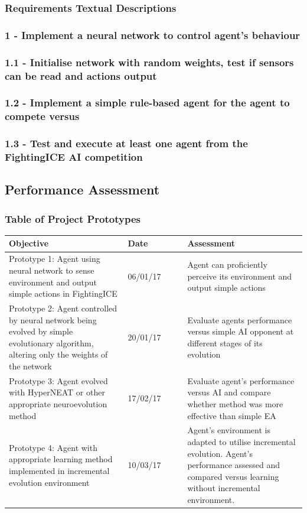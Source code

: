 \documentclass[11pt,a4paper]{article}
\begin{document}
\subsubsection{Requirements Textual Descriptions}
\subsubsection*{1 - Implement a neural network to control agent's behaviour}
\subsubsection*{1.1 - Initialise network with random weights, test if sensors can be read and actions output}
\subsubsection*{1.2 - Implement a simple rule-based agent for the agent to compete versus}
\subsubsection*{1.3 - Test and execute at least one agent from the FightingICE AI competition}
\newpage
\subsection{Performance Assessment}
\subsubsection{Table of Project Prototypes}
\begin{tabular}{|p{0.4\linewidth}|p{0.2\linewidth}|p{0.4\linewidth}|}
\hline
Objective & Date & Assessment\\ \hline
Prototype 1: Agent using neural network to sense environment and output simple actions in FightingICE & 06/01/17 & Agent can proficiently perceive its environment and output simple actions\\ \hline
Prototype 2: Agent controlled by neural network being evolved by simple evolutionary algorithm, altering only the weights of the network & 20/01/17 & Evaluate agents performance versus simple AI opponent at different stages of its evolution\\ \hline
Prototype 3: Agent evolved with HyperNEAT or other appropriate neuroevolution method & 17/02/17 & Evaluate agent's performance versus AI and compare whether method was more effective than simple EA\\ \hline
Prototype 4: Agent with appropriate learning method implemented in incremental evolution environment & 10/03/17 & Agent's environment is adapted to utilise incremental evolution. Agent's performance assessed and compared versus learning without incremental environment.\\ \hline
\end{tabular}
\newpage
\end{document}
